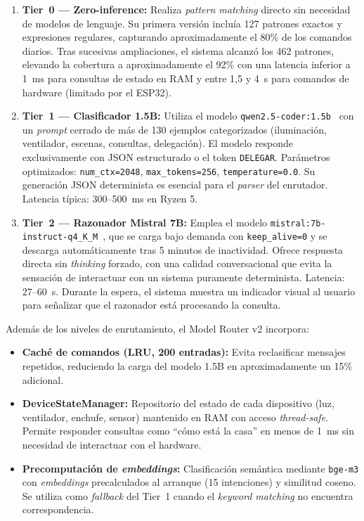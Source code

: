\begin{enumerate}
    \item \textbf{Tier~0 --- Zero-inference:} Realiza \textit{pattern matching} directo sin necesidad de modelos de lenguaje. Su primera versión incluía 127 patrones exactos y expresiones regulares, capturando aproximadamente el 80\% de los comandos diarios. Tras sucesivas ampliaciones, el sistema alcanzó los 462 patrones, elevando la cobertura a aproximadamente el 92\% con una latencia inferior a 1~ms para consultas de estado en RAM y entre 1,5 y 4~s para comandos de hardware (limitado por el ESP32).
    \item \textbf{Tier~1 --- Clasificador 1.5B:} Utiliza el modelo \texttt{qwen2.5-coder:1.5b}~\cite{hui_qwen25_coder_2024} con un \textit{prompt} cerrado de más de 130 ejemplos categorizados (iluminación, ventilador, escenas, consultas, delegación). El modelo responde exclusivamente con JSON estructurado o el token \texttt{DELEGAR}. Parámetros optimizados: \texttt{num\_ctx=2048}, \texttt{max\_tokens=256}, \texttt{temperature=0.0}. Su generación JSON determinista es esencial para el \textit{parser} del enrutador. Latencia típica: 300--500~ms en Ryzen 5.
    \item \textbf{Tier~2 --- Razonador Mistral 7B:} Emplea el modelo \texttt{mistral:7b-instruct-q4\_K\_M}~\cite{mistral_7b}, que se carga bajo demanda con \texttt{keep\_alive=0} y se descarga automáticamente tras 5 minutos de inactividad. Ofrece respuesta directa sin \textit{thinking} forzado, con una calidad conversacional que evita la sensación de interactuar con un sistema puramente determinista. Latencia: 27--60~s. Durante la espera, el sistema muestra un indicador visual al usuario para señalizar que el razonador está procesando la consulta.
\end{enumerate}

Además de los niveles de enrutamiento, el Model Router v2 incorpora:

\begin{itemize}
    \item \textbf{Caché de comandos (LRU, 200 entradas):} Evita reclasificar mensajes repetidos, reduciendo la carga del modelo 1.5B en aproximadamente un 15\% adicional.
    \item \textbf{DeviceStateManager:} Repositorio del estado de cada dispositivo (luz, ventilador, enchufe, sensor) mantenido en RAM con acceso \textit{thread-safe}. Permite responder consultas como ``cómo está la casa'' en menos de 1~ms sin necesidad de interactuar con el hardware.
    \item \textbf{Precomputación de \textit{embeddings}:} Clasificación semántica mediante \texttt{bge-m3} con \textit{embeddings} precalculados al arranque (15 intenciones) y similitud coseno. Se utiliza como \textit{fallback} del Tier~1 cuando el \textit{keyword matching} no encuentra correspondencia.
\end{itemize}

